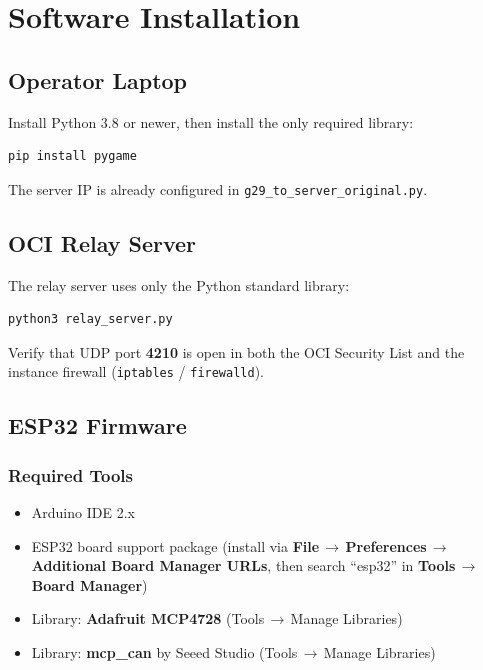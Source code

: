 ﻿\documentclass[12pt, letterpaper]{article}
\begin{document}
\section{Software Installation}

\subsection{Operator Laptop}

Install Python 3.8 or newer, then install the only required library:

\begin{lstlisting}[style=terminal]
pip install pygame
\end{lstlisting}

The server IP is already configured in \texttt{g29\_to\_server\_original.py}.

\subsection{OCI Relay Server}

The relay server uses only the Python standard library:

\begin{lstlisting}[style=terminal]
python3 relay_server.py
\end{lstlisting}

Verify that UDP port \textbf{4210} is open in both the OCI Security List and the
instance firewall (\texttt{iptables} / \texttt{firewalld}).

\subsection{ESP32 Firmware}

\subsubsection*{Required Tools}

\begin{itemize}
  \item Arduino IDE 2.x
  \item ESP32 board support package (install via \textbf{File\,$\to$\,Preferences\,$\to$\,Additional
        Board Manager URLs}, then search ``esp32'' in \textbf{Tools\,$\to$\,Board Manager})
  \item Library: \textbf{Adafruit MCP4728} (Tools\,$\to$\,Manage Libraries)
  \item Library: \textbf{mcp\_can} by Seeed Studio (Tools\,$\to$\,Manage Libraries)
\end{itemize}
\end{document}
